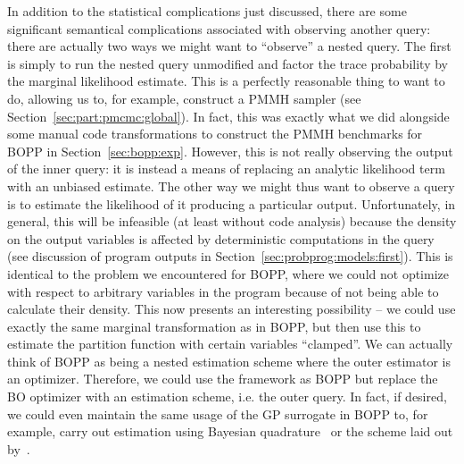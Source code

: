 In addition to the statistical complications just discussed,
there are some significant semantical complications associated with observing
another query: there are actually two ways we might want to ``observe'' a nested query.
The first is simply to run the nested query unmodified and factor the trace probability
by the marginal likelihood estimate.  This is a perfectly reasonable thing to want to do,
allowing us to, for example, construct a PMMH sampler (see
Section~\ref{sec:part:pmcmc:global}).  In fact, this was exactly what we did alongside
some manual code transformations to
construct the PMMH benchmarks for BOPP in Section~\ref{sec:bopp:exp}.  However,
this is not really observing the output of the inner query: it is instead a means of
replacing an analytic likelihood term with an unbiased estimate.  The other way we might thus
want to observe a query is to estimate the likelihood of it producing a particular output.
Unfortunately, in general, this will be infeasible (at least without code analysis) 
because the density on the output variables is affected by deterministic computations in the query
(see discussion of program outputs in Section~\ref{sec:probprog:models:first}).  
This is identical to the
problem we encountered for BOPP, where we could not optimize with respect to arbitrary
variables in the program because of not being able to calculate their density.
This now presents an interesting possibility -- we could use exactly the same
marginal transformation as in BOPP, but then use this to estimate the partition
function with certain variables ``clamped''.  We can actually think of BOPP as being
a nested estimation scheme where the outer estimator is an optimizer.  Therefore, we
could use the framework as BOPP but replace the BO optimizer
with an estimation scheme, i.e. the outer query.  In fact, if desired, we could even 
maintain the same usage of the GP surrogate in BOPP to, for example, carry out estimation
using Bayesian quadrature~\citep{osborne2012active} or the scheme laid out
by~\citep{gutmann2016bayesian}.

